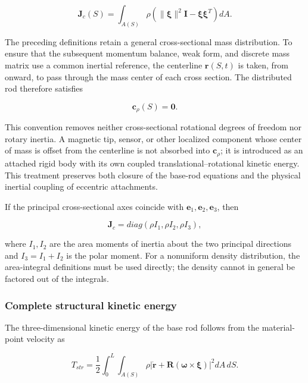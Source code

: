 \begin{equation}
\label{eq:rod-1-25}
\mathbf{J}_{c}(S) = \int_{A(S)}^{}\rho\left( \parallel \bm{\xi} \parallel^{2}\mathbf{I} - \bm{\xi}\bm{\xi}^{T} \right)dA.
\end{equation}

The preceding definitions retain a general cross-sectional mass distribution. To ensure that the subsequent momentum balance, weak form, and discrete mass matrix use a common inertial reference, the centerline \(\mathbf{r}(S,t)\) is taken, from  onward, to pass through the mass center of each cross section. The distributed rod therefore satisfies

\begin{equation}
\label{eq:rod-1-26}
\boxed{\mathbf{c}_{\rho}(S) = \mathbf{0}.}
\end{equation}

This convention removes neither cross-sectional rotational degrees of freedom nor rotary inertia. A magnetic tip, sensor, or other localized component whose center of mass is offset from the centerline is not absorbed into \(\mathbf{c}_{\rho}\); it is introduced as an attached rigid body with its own coupled translational--rotational kinetic energy. This treatment preserves both closure of the base-rod equations and the physical inertial coupling of eccentric attachments.

If the principal cross-sectional axes coincide with \(\mathbf{e}_{1},\mathbf{e}_{2},\mathbf{e}_{3}\), then

\begin{equation}
\label{eq:rod-1-27}
\mathbf{J}_{c} = diag\left( \rho I_{1},\rho I_{2},\rho I_{3} \right),
\end{equation}

where \(I_{1},I_{2}\) are the area moments of inertia about the two principal directions and \(I_{3} = I_{1} + I_{2}\) is the polar moment. For a nonuniform density distribution, the area-integral definitions must be used directly; the density cannot in general be factored out of the integrals.

\subsubsection{Complete structural kinetic energy}\label{sec:rod-1-3-2}

The three-dimensional kinetic energy of the base rod follows from the material-point velocity as

\begin{equation}
\label{eq:rod-1-28}
T_{str} = \frac{1}{2}\int_{0}^{L}{\int_{A(S)}^{}\rho}\left| \dot{\mathbf{r}} + \mathbf{R}\left( \bm{\omega} \times \bm{\xi} \right) \right|^{2}dA\, dS.
\end{equation}

